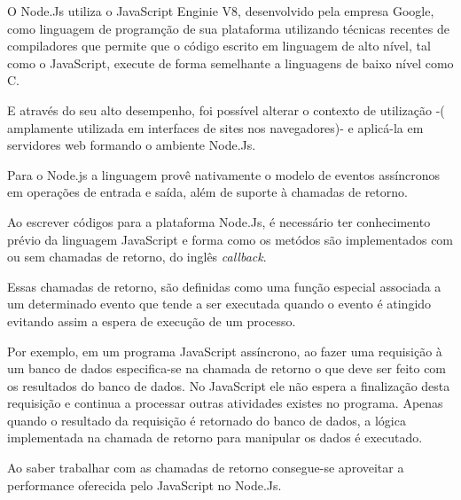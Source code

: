   O Node.Js utiliza o JavaScript Enginie V8, desenvolvido pela empresa Google, como linguagem de programção
  de sua plataforma utilizando técnicas recentes de compiladores que permite que o código escrito em linguagem de alto nível,
  tal como o JavaScript, execute de forma semelhante a linguagens de baixo nível como C. 
  
  E através do seu alto desempenho, foi possível alterar o contexto de utilização -(
  amplamente utilizada em interfaces de sites nos navegadores)- e aplicá-la em servidores web formando 
  o ambiente Node.Js.
  
  
  Para o Node.js a linguagem provê nativamente o modelo de eventos assíncronos em operações de entrada e saída, 
  além de suporte à chamadas de retorno.\cite{Oliveira:2012}
  
  
  Ao escrever códigos para a plataforma Node.Js, é necessário ter conhecimento prévio da linguagem JavaScript e forma como os 
  metódos são implementados com ou sem chamadas de retorno, do inglês \textit{callback}. \cite{Hughes:2012}
  

  Essas chamadas de retorno, são definidas como uma função especial associada a um determinado evento que tende a ser 
  executada quando o evento é atingido evitando assim a espera de execução de um processo.\cite{Wilson:2013} 
  
  Por exemplo, em um programa JavaScript assíncrono, ao fazer uma requisição 
  à um banco de dados especifica-se na chamada de retorno o que deve ser feito com os resultados do banco de dados. No JavaScript
  ele não espera a finalização desta requisição e continua a processar outras atividades existes no programa. 
  Apenas quando o resultado da requisição é retornado do banco de dados, a lógica implementada na chamada de retorno para manipular 
  os dados é executado. \cite[p. 2]{Junior:2012}
  
  Ao saber trabalhar com as chamadas de retorno consegue-se aproveitar a performance oferecida pelo JavaScript no Node.Js.
  
